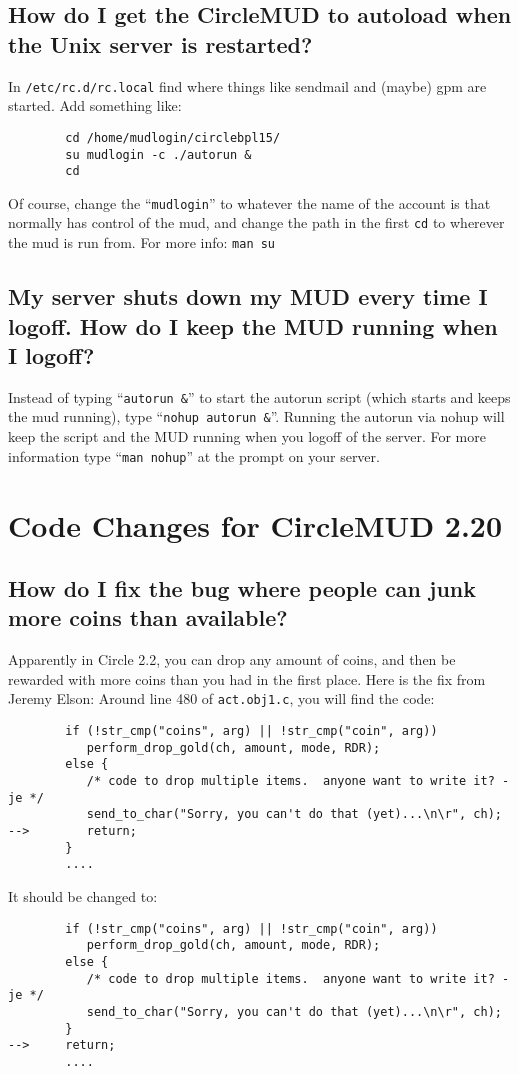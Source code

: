 \documentclass[11pt]{article}
\begin{document}
\subsection{How do I get the CircleMUD to autoload when the Unix server is restarted?}
In \texttt{/etc/rc.d/rc.local} find where things like sendmail and (maybe) gpm are started.  Add something like:
\begin{verbatim}
        cd /home/mudlogin/circlebpl15/
        su mudlogin -c ./autorun &
        cd
\end{verbatim}
Of course, change the ``\texttt{mudlogin}'' to whatever the name of the account is that normally has control of the mud, and change the path in the first \texttt{cd} to wherever the mud is run from.\newline
For more info: \texttt{man su}

\subsection{My server shuts down my MUD every time I logoff. How do I keep the MUD running when I logoff?}
Instead of typing ``\texttt{autorun \&}'' to start the autorun script (which starts and keeps the mud running), type ``\texttt{nohup autorun \&}''. Running the autorun via nohup will keep the script and the MUD running when you logoff of the server. For more information type ``\texttt{man nohup}'' at the prompt on your server.

\section{Code Changes for CircleMUD 2.20}
\subsection{How do I fix the bug where people can junk more coins than available?}
Apparently in Circle 2.2, you can drop any amount of coins, and then be rewarded with more coins than you had in the first place.  Here is the fix from Jeremy Elson:\newline
Around line 480 of \texttt{act.obj1.c}, you will find the code:
\begin{verbatim}
        if (!str_cmp("coins", arg) || !str_cmp("coin", arg))
           perform_drop_gold(ch, amount, mode, RDR);
        else {
           /* code to drop multiple items.  anyone want to write it? -je */
           send_to_char("Sorry, you can't do that (yet)...\n\r", ch);
-->        return;
        }
        ....
\end{verbatim}
It should be changed to:
\begin{verbatim}
        if (!str_cmp("coins", arg) || !str_cmp("coin", arg))
           perform_drop_gold(ch, amount, mode, RDR);
        else {
           /* code to drop multiple items.  anyone want to write it? -je */
           send_to_char("Sorry, you can't do that (yet)...\n\r", ch);
        }
-->     return;
        ....
\end{verbatim}
\end{document}
